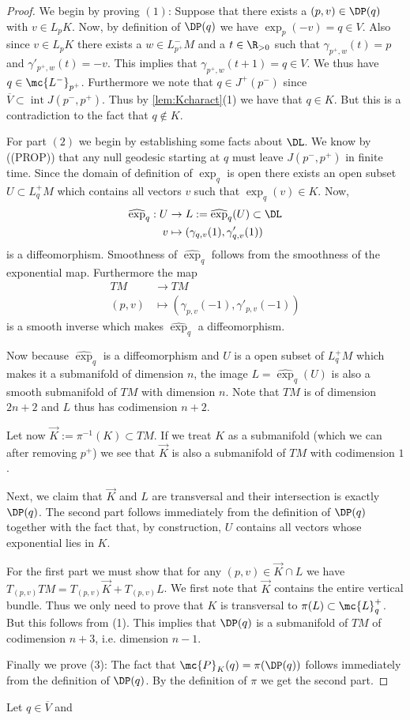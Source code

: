 \begin{proof}
We begin by proving $(1)$: Suppose that there exists a $(p,v) \in \DP(q)$ with $v\in L_pK$. Now, by definition of $\DP(q)$ we have $\exp_p(-v) = q\in V$. Also since $v\in L_pK$ there exists a $w\in L^-_{p^+}M$ and a $t\in \R_{>0}$ such that $\gamma_{p^+,w}(t) = p$ and $\gamma'_{p^+,w}(t) = -v$. This implies that $\gamma_{p^+,w}(t+1) = q \in V$. We thus have $q \in \mc{L^-}_{p^+}$. Furthermore we note that $q\in J^+(p^-)$ since $\overline{V}\subset \operatorname{int}J(p^-,p^+)$.
Thus by \ref{lem:Kcharact}(1) we have that $q\in K$. But this is a contradiction to the fact that $q\notin K$.

For part $(2)$ we begin by establishing some facts about $\DL$. We know by ((PROP)) that any null geodesic starting at $q$ must leave $J(p^-,p^+)$ in finite time. Since the domain of definition of $\exp_q$ is open there exists an open subset $U\subset L^+_qM$ which contains all vectors $v$ such that $\exp_q(v)\in K$. Now, 
\begin{align*}
    \widehat{\exp}_q: U &\to L:=\widehat{\exp}_q(U) \subset \DL \\
    v &\mapsto (\gamma_{q,v}(1),\gamma'_{q,v}(1))
\end{align*}
is a diffeomorphism. Smoothness of $\widehat{\exp}_q$ follows from the smoothness of the exponential map. Furthermore the map
\begin{align*}
    TM &\to TM \\
    (p,v) &\mapsto (\gamma_{p,v}(-1),\gamma'_{p,v}(-1))
\end{align*}
is a smooth inverse which makes $\widehat{\exp}_q$ a diffeomorphism.

Now because $\widehat{\exp}_q$ is a diffeomorphism and $U$ is a open subset of $L^+_qM$ which makes it a submanifold of dimension $n$, the image $L=\widehat{\exp}_q(U)$ is also a smooth submanifold of $TM$ with dimension $n$. Note that $TM$ is of dimension $2n+2$ and $L$ thus has codimension $n+2$.

Let now $\overrightarrow{K}:=\pi^{-1}(K)\subset TM$. If we treat $K$ as a submanifold (which we can after removing $p^+$) we see that $\overrightarrow{K}$ is also a submanifold of $TM$ with codimension $1$.

Next, we claim that $\overrightarrow{K}$ and $L$ are transversal and their intersection is exactly $\DP(q)$. The second part follows immediately from the definition of $\DP(q)$ together with the fact that, by construction, $U$ contains all vectors whose exponential lies in $K$. 

For the first part we must show that for any $(p,v)\in \overrightarrow{K} \cap L$ we have $T_{(p,v)}TM = T_{(p,v)}\overrightarrow{K} + T_{(p,v)}L$. 
We first note that $\overrightarrow{K}$ contains the entire vertical bundle. Thus we only need to prove that $K$ is transversal to $\pi(L)\subset \mc{L}^+_q$. But this follows from (1). This implies that $\DP(q)$ is a submanifold of $TM$ of codimension $n+3$, i.e. dimension $n-1$.

Finally we prove (3): The fact that $\mc{P}_K(q) = \pi( \DP(q))$ follows immediately from the definition of $\DP(q)$. By the definition of $\pi$ we get the second part.
\end{proof}

\begin{lemma}
Let $q\in \overline{V}$ and 
\end{lemma}